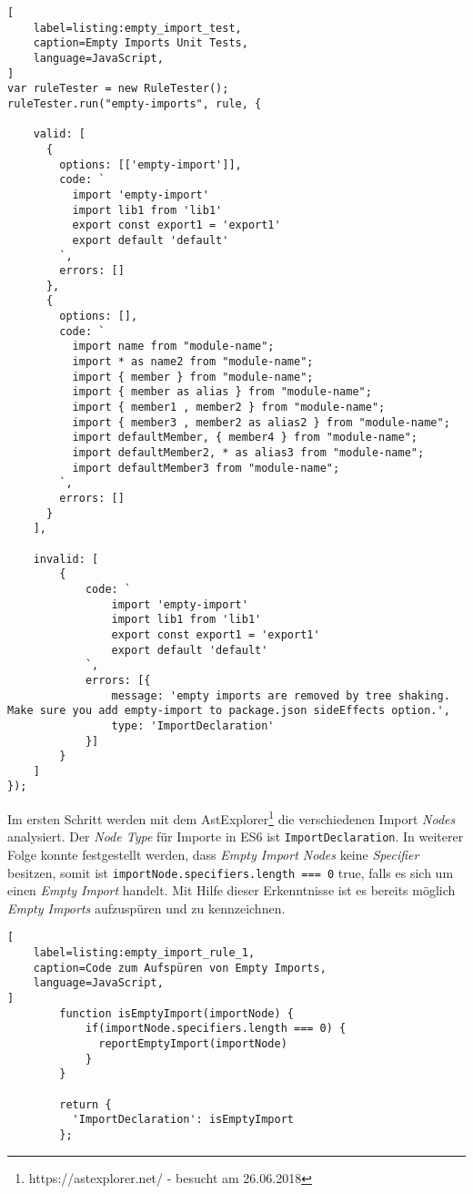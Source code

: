 \begin{lstlisting}[
    label=listing:empty_import_test,
	caption=Empty Imports Unit Tests,
	language=JavaScript,
]
var ruleTester = new RuleTester();
ruleTester.run("empty-imports", rule, {

    valid: [
      {
        options: [['empty-import']],
        code: `
          import 'empty-import'
          import lib1 from 'lib1'
          export const export1 = 'export1'
          export default 'default'
        `,
        errors: []
      },
      {
        options: [],
        code: `
          import name from "module-name";
          import * as name2 from "module-name";
          import { member } from "module-name";
          import { member as alias } from "module-name";
          import { member1 , member2 } from "module-name";
          import { member3 , member2 as alias2 } from "module-name";
          import defaultMember, { member4 } from "module-name";
          import defaultMember2, * as alias3 from "module-name";
          import defaultMember3 from "module-name";
        `,
        errors: []
      }
    ],

    invalid: [
        {
            code: `
                import 'empty-import'
                import lib1 from 'lib1'
                export const export1 = 'export1'
                export default 'default'
            `,
            errors: [{
                message: 'empty imports are removed by tree shaking. Make sure you add empty-import to package.json sideEffects option.',
                type: 'ImportDeclaration'
            }]
        }
    ]
});
\end{lstlisting}

Im ersten Schritt werden mit dem AstExplorer\footnote{https://astexplorer.net/ - besucht am 26.06.2018} die 
verschiedenen Import \textit{Nodes} analysiert. Der \textit{Node Type} für Importe in ES6 ist \lstinline{ImportDeclaration}. In weiterer Folge konnte festgestellt werden, dass \textit{Empty Import Nodes} keine \textit{Specifier} besitzen, somit ist \lstinline{importNode.specifiers.length === 0} true, falls es sich um einen \textit{Empty Import} handelt. Mit Hilfe dieser Erkenntnisse ist es bereits möglich \textit{Empty Imports} aufzuspüren und zu kennzeichnen.

\begin{lstlisting}[
    label=listing:empty_import_rule_1,
	caption=Code zum Aufspüren von Empty Imports,
	language=JavaScript,
]
        function isEmptyImport(importNode) {
            if(importNode.specifiers.length === 0) {
              reportEmptyImport(importNode)
            }
        }

        return {
          'ImportDeclaration': isEmptyImport
        };
\end{lstlisting}

